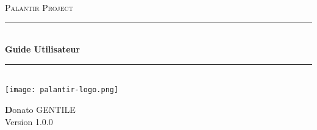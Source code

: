 \begin{titlepage}

\newcommand{\HRule}{\rule{\linewidth}{0.5mm}}

\center
\textsc{\Large Palantir Project}\\[0.5cm]

\HRule \\[0.5cm]
{\huge \bfseries Guide Utilisateur}\\
\HRule \\[1.5cm]

\texttt{[image: palantir-logo.png]}\\[1cm]

\begin{center} 
\textbf Donato GENTILE\\
Version 1.0.0
\end{center}

\end{titlepage}
